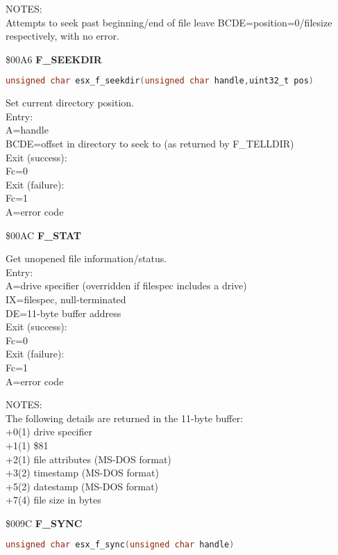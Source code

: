 NOTES:\\
Attempts to seek past beginning/end of file leave BCDE=position=0/filesize\\
respectively, with no error.

\$00A6 \textbf{F\_SEEKDIR}

\begin{lstlisting}[language=C]
unsigned char esx_f_seekdir(unsigned char handle,uint32_t pos)
\end{lstlisting}

Set current directory position.\\
Entry:\\
A=handle\\
BCDE=offset in directory to seek to (as returned by F\_TELLDIR)\\
Exit (success):\\
Fc=0\\
Exit (failure):\\
Fc=1\\
A=error code

\$00AC \textbf{F\_STAT}

Get unopened file information/status.\\
Entry:\\
A=drive specifier (overridden if filespec includes a drive)\\
IX=filespec, null-terminated\\
DE=11-byte buffer address\\
Exit (success):\\
Fc=0\\
Exit (failure):\\
Fc=1\\
A=error code

NOTES:\\
The following details are returned in the 11-byte buffer:\\
+0(1) drive specifier\\
+1(1) \$81\\
+2(1) file attributes (MS-DOS format)\\
+3(2) timestamp (MS-DOS format)\\
+5(2) datestamp (MS-DOS format)\\
+7(4) file size in bytes

\$009C \textbf{F\_SYNC}

\begin{lstlisting}[language=C]
unsigned char esx_f_sync(unsigned char handle)
\end{lstlisting}


